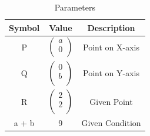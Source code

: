 \documentclass[journal,12pt,twocolumn]{IEEEtran}
\begin{document}
\begin{table}[h]
    \centering
    \begin{tabular}{|c|c|c|}
       \hline
       \textbf{Symbol}&\textbf{Value}&\textbf{Description}  \\
       \hline
        P & $\begin{pmatrix}
  a\\
  0\\
 \end{pmatrix}$%
 & Point on X-axis\\
        \hline
        Q & $\begin{pmatrix}
  0\\
  b\\
 \end{pmatrix}$%
 & Point on Y-axis\\
        \hline
        R & $\begin{pmatrix}
  2\\
  2\\
 \end{pmatrix}$%
 & Given Point \\
        \hline
        a + b & 9 & Given Condition\\
        \hline
    \end{tabular}
    \caption{Parameters}
    \label{tab:my_label}
\end{table}
\end{document}
